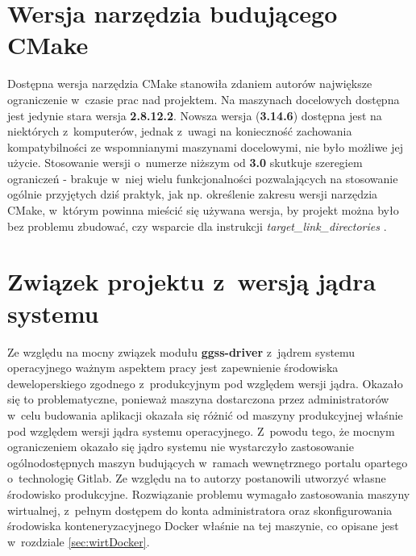 \section{Wersja narzędzia budującego CMake}
Dostępna wersja narzędzia CMake stanowiła zdaniem autorów największe ograniczenie w~czasie prac nad projektem. Na maszynach docelowych dostępna jest jedynie stara wersja \textbf{2.8.12.2}. Nowsza wersja (\textbf{3.14.6}) dostępna jest na niektórych z~komputerów, jednak z~uwagi na konieczność zachowania kompatybilności ze wspomnianymi maszynami docelowymi, nie było możliwe jej użycie. Stosowanie wersji o~numerze niższym od \textbf{3.0} skutkuje szeregiem ograniczeń - brakuje w~niej wielu funkcjonalności pozwalających na stosowanie ogólnie przyjętych dziś praktyk, jak np. określenie zakresu wersji narzędzia CMake, w~którym powinna mieścić się używana wersja, by projekt można było bez problemu zbudować, czy wsparcie dla instrukcji \textit{target\_link\_directories} \cite{NewInCMake}.

\section{Związek projektu z~wersją jądra systemu}
Ze względu na mocny związek modułu \textbf{ggss-driver} z~jądrem systemu operacyjnego ważnym aspektem pracy jest zapewnienie środowiska deweloperskiego zgodnego z~produkcyjnym pod względem wersji jądra. Okazało się to problematyczne, ponieważ maszyna dostarczona przez administratorów w~celu budowania aplikacji okazała się różnić od maszyny produkcyjnej właśnie pod względem wersji jądra systemu operacyjnego. Z~powodu tego, że mocnym ograniczeniem okazało się jądro systemu nie wystarczyło zastosowanie ogólnodostępnych maszyn budujących w~ramach wewnętrznego portalu opartego o~technologię Gitlab. Ze względu na to autorzy postanowili utworzyć własne środowisko produkcyjne. Rozwiązanie problemu wymagało zastosowania maszyny wirtualnej, z~pełnym dostępem do konta administratora oraz skonfigurowania środowiska konteneryzacyjnego Docker właśnie na tej maszynie, co opisane jest w~rozdziale \ref{sec:wirtDocker}.



